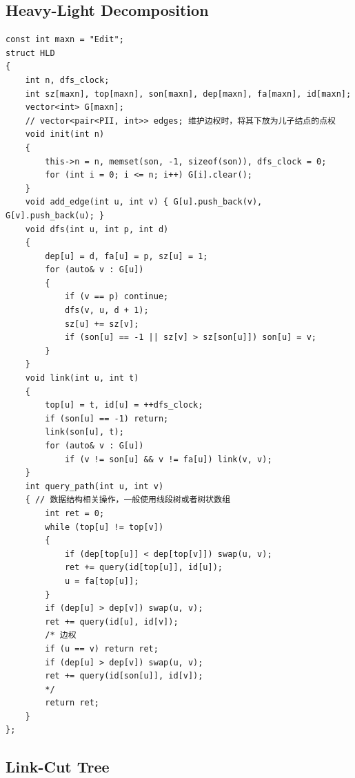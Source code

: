 \documentclass[twoside]{article}
\begin{document}
\subsection{Heavy-Light Decomposition}
\begin{lstlisting}
const int maxn = "Edit";
struct HLD
{
    int n, dfs_clock;
    int sz[maxn], top[maxn], son[maxn], dep[maxn], fa[maxn], id[maxn];
    vector<int> G[maxn];
    // vector<pair<PII, int>> edges; 维护边权时，将其下放为儿子结点的点权
    void init(int n)
    {
        this->n = n, memset(son, -1, sizeof(son)), dfs_clock = 0;
        for (int i = 0; i <= n; i++) G[i].clear();
    }
    void add_edge(int u, int v) { G[u].push_back(v), G[v].push_back(u); }
    void dfs(int u, int p, int d)
    {
        dep[u] = d, fa[u] = p, sz[u] = 1;
        for (auto& v : G[u])
        {
            if (v == p) continue;
            dfs(v, u, d + 1);
            sz[u] += sz[v];
            if (son[u] == -1 || sz[v] > sz[son[u]]) son[u] = v;
        }
    }
    void link(int u, int t)
    {
        top[u] = t, id[u] = ++dfs_clock;
        if (son[u] == -1) return;
        link(son[u], t);
        for (auto& v : G[u])
            if (v != son[u] && v != fa[u]) link(v, v);
    }
    int query_path(int u, int v)
    { // 数据结构相关操作，一般使用线段树或者树状数组
        int ret = 0;
        while (top[u] != top[v])
        {
            if (dep[top[u]] < dep[top[v]]) swap(u, v);
            ret += query(id[top[u]], id[u]);
            u = fa[top[u]];
        }
        if (dep[u] > dep[v]) swap(u, v);
        ret += query(id[u], id[v]);
        /* 边权
        if (u == v) return ret;
        if (dep[u] > dep[v]) swap(u, v);
        ret += query(id[son[u]], id[v]);
        */
        return ret;
    }
};
\end{lstlisting}
\subsection{Link-Cut Tree}
\end{document}
